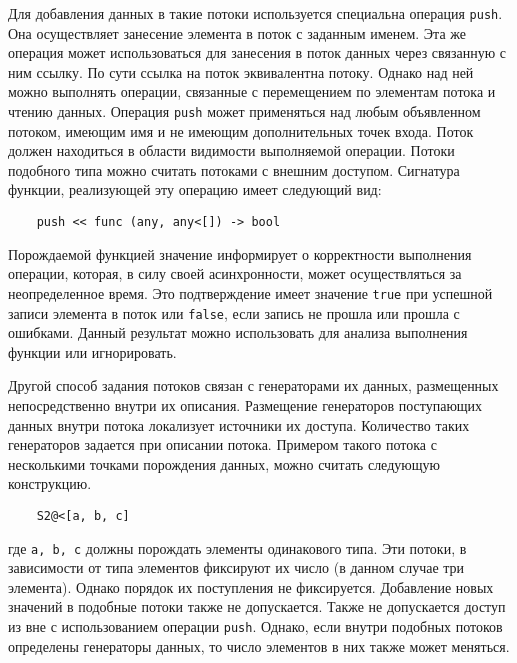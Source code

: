 Для добавления данных в такие потоки используется специальна операция \verb|push|. Она осуществляет занесение элемента в поток с заданным именем. Эта же операция может использоваться для занесения в поток данных через связанную с ним ссылку. По сути ссылка на поток эквивалентна потоку. Однако над ней можно выполнять операции, связанные с перемещением по элементам потока и чтению данных. Операция \verb|push| может применяться над любым объявленном потоком, имеющим имя и не имеющим дополнительных точек входа. Поток должен находиться в области видимости выполняемой операции. Потоки подобного типа можно считать потоками с внешним доступом. Сигнатура функции, реализующей эту операцию имеет следующий вид:
\begin{verbatim}
    push << func (any, any<[]) -> bool
\end{verbatim}
Порождаемой функцией значение информирует о корректности выполнения операции, которая, в силу своей асинхронности, может осуществляться за неопределенное время. Это подтверждение имеет значение \verb|true| при успешной записи элемента в поток или \verb|false|, если запись не прошла или прошла с ошибками. Данный результат можно использовать для анализа выполнения функции или игнорировать.


Другой способ задания потоков связан с генераторами их данных, размещенных непосредственно внутри их описания. Размещение генераторов поступающих данных внутри потока локализует источники их доступа. Количество таких генераторов задается при описании потока. Примером такого потока с несколькими точками порождения данных, можно считать следующую конструкцию.
\begin{verbatim}
    S2@<[a, b, c]
\end{verbatim}
где \verb|a, b, c| должны порождать элементы одинакового типа. Эти потоки, в зависимости от типа элементов фиксируют их число (в данном случае три элемента). Однако порядок их поступления не фиксируется. Добавление новых значений в подобные потоки также не допускается. Также не допускается доступ из вне с использованием операции \verb|push|. Однако, если внутри подобных потоков определены генераторы данных, то число элементов в них также может меняться.


